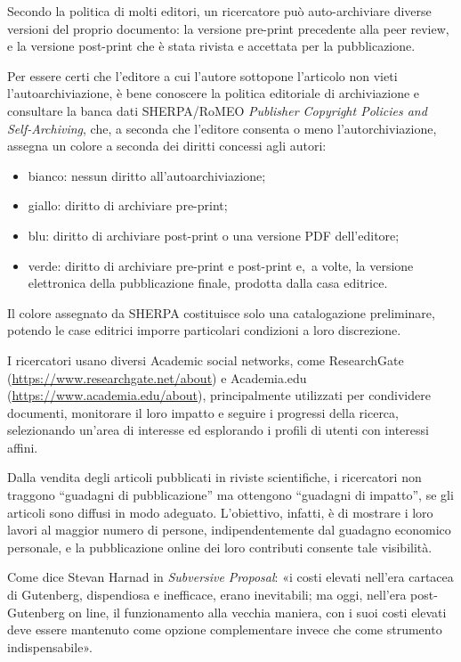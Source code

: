 \documentclass[
  b5paper,
  twoside,
  11pt,
  chapterprefix=false,
  bibliography=totocnumbered,
  listof=flat]{scrbook}
\begin{document}
Secondo la politica di molti editori, un ricercatore può auto-archiviare
diverse versioni del proprio documento: la versione pre-print precedente
alla peer review, e la versione post-print che è stata rivista e
accettata per la pubblicazione.

Per essere certi che l'editore a cui l'autore sottopone l'articolo non
vieti l'autoarchiviazione, è bene conoscere la politica editoriale di
archiviazione e consultare la banca dati SHERPA/RoMEO \emph{Publisher
Copyright Policies and Self-Archiving}, che, a seconda che l'editore
consenta o meno l'autorchiviazione, assegna un colore a seconda dei
diritti concessi agli autori:

\begin{itemize}
\item
  bianco: nessun diritto all'autoarchiviazione;
\item
  giallo: diritto di archiviare pre-print;
\item
  blu: diritto di archiviare post-print o una versione PDF
  dell'editore;
\item
  verde: diritto di archiviare pre-print e post-print e,~a volte, la
  versione elettronica della pubblicazione finale, prodotta dalla casa
  editrice.
\end{itemize}

Il colore assegnato da SHERPA costituisce solo una catalogazione
preliminare, potendo le case editrici imporre particolari condizioni a
loro discrezione.

I ricercatori usano diversi Academic social networks, come ResearchGate
(\href{https://www.researchgate.net/about}{{https://www.researchgate.net/about}})
e Academia.edu
(\href{https://www.academia.edu/about}{{https://www.academia.edu/about}}),
principalmente utilizzati per condividere documenti, monitorare il loro
impatto e seguire i progressi della ricerca, selezionando un'area di
interesse ed esplorando i profili di utenti con interessi affini.

Dalla vendita degli articoli pubblicati in riviste scientifiche, i
ricercatori non traggono \enquote{guadagni di pubblicazione} ma ottengono
\enquote{guadagni di impatto}, se gli articoli sono diffusi in modo adeguato.
L'obiettivo, infatti, è di mostrare i loro lavori al maggior numero di
persone, indipendentemente dal guadagno economico personale, e la
pubblicazione online dei loro contributi consente tale visibilità.

Come dice Stevan Harnad in \emph{Subversive} \emph{Proposal}: «i costi elevati
nell'era cartacea di Gutenberg, dispendiosa e inefficace, erano
inevitabili; ma oggi, nell'era post-Gutenberg on line, il funzionamento
alla vecchia maniera, con i suoi costi elevati deve essere mantenuto
come opzione complementare invece che come strumento indispensabile».
\end{document}
